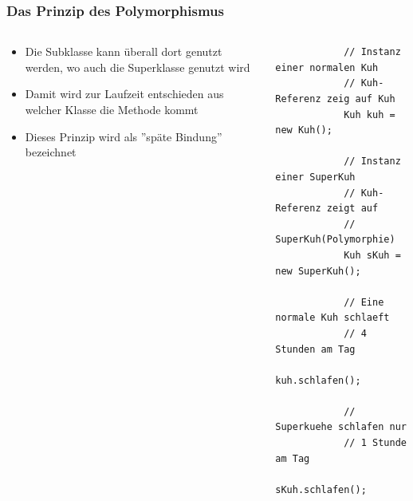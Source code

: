 \begin{frame}[fragile]
\frametitle{Das Prinzip des Polymorphismus}
\begin{columns}
	\begin{column}{.4\textwidth}
		\small
		\begin{itemize} 
		  	\item Die Subklasse kann \"uberall dort genutzt werden, wo auch die
		  	Superklasse genutzt wird
		  	\item Damit wird zur Laufzeit entschieden aus welcher Klasse die Methode
		  	kommt
			\item Dieses Prinzip wird als ''sp\"ate Bindung'' bezeichnet
		\end{itemize}
	\end{column}
 	\begin{column}{.6\textwidth} 
		\begin{lstlisting}
			// Instanz einer normalen Kuh
			// Kuh-Referenz zeig auf Kuh
			Kuh kuh = new Kuh();
			
			// Instanz einer SuperKuh
			// Kuh-Referenz zeigt auf 
			// SuperKuh(Polymorphie)
			Kuh sKuh = new SuperKuh();
			
			// Eine normale Kuh schlaeft 
			// 4 Stunden am Tag
			kuh.schlafen();
			
			// Superkuehe schlafen nur 
			// 1 Stunde am Tag
			sKuh.schlafen();
		\end{lstlisting}
	\end{column}
\end{columns}
\end{frame}

